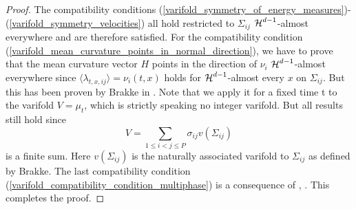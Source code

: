 \begin{proof}
	The compatibility conditions 
	(\ref{varifold_symmetry_of_energy_measures})-(\ref{varifold_symmetry_velocities})
	all hold restricted to $ \Sigma_{ i j } $ $ \operatorname{\mathcal{H}}^{ d - 1 } $-almost 
	everywhere and are therefore satisfied.
	For the compatibility condition 
	(\ref{varifold_mean_curvature_points_in_normal_direction}), we have to 
	prove that the 
	mean curvature vector $ H $ points in the direction of $ \nu_{ i } $ $ 
	\operatorname{\mathcal{H}}^{ d - 1 } $-almost everywhere since $ \langle \lambda_{ t , x , i j } 
	\rangle = \nu_{ i } ( t , 
	x ) $ holds for $ \operatorname{\mathcal{H}}^{ d- 1 } $-almost every $ x $ on $ \Sigma_{ i j } $. 
	But this has been proven by Brakke in 
	\cite[Thm.~5.8]{brakke_kenneth_motion_of_surface_by_mean_curvature}. Note 
	that we apply it for a fixed time t to the varifold $ V = \mu_{ t } $, 
	which is strictly speaking no integer varifold. But all results still hold 
	since 
	\begin{equation*}
		V = 
		\sum_{ 1 \leq i < j \leq P }
		\sigma_{ i j }
		v ( \Sigma_{ i j } )
	\end{equation*}
	is a finite sum. Here $ v ( \Sigma_{ i j } ) $ is the naturally associated 
	varifold to $ \Sigma_{ i j } $ as defined by Brakke.
	The last compatibility condition 
	(\ref{varifold_compatibility_condition_multiphase}) is a consequence of 
	,
	. 
	This completes the proof.
\end{proof}

